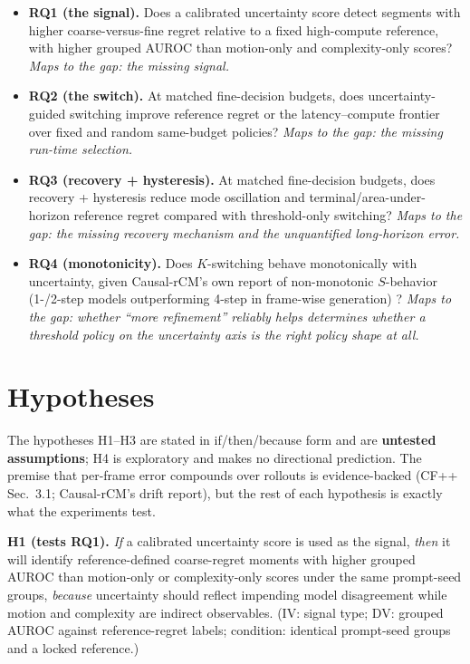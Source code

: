 \documentclass[11pt,a4paper]{article}
\begin{document}
\begin{itemize}[leftmargin=1.6em, itemsep=2pt]
\item \textbf{RQ1 (the signal).} Does a calibrated uncertainty score detect segments with higher coarse-versus-fine regret relative to a fixed high-compute reference, with higher grouped AUROC than motion-only and complexity-only scores? \emph{Maps to the gap: the missing signal.}
\item \textbf{RQ2 (the switch).} At matched fine-decision budgets, does uncertainty-guided switching improve reference regret or the latency--compute frontier over fixed and random same-budget policies? \emph{Maps to the gap: the missing run-time selection.}
\item \textbf{RQ3 (recovery + hysteresis).} At matched fine-decision budgets, does recovery + hysteresis reduce mode oscillation and terminal/area-under-horizon reference regret compared with threshold-only switching? \emph{Maps to the gap: the missing recovery mechanism and the unquantified long-horizon error.}
\item \textbf{RQ4 (monotonicity).} Does $K$-switching behave monotonically with uncertainty, given Causal-rCM's own report of non-monotonic $S$-behavior (1-/2-step models outperforming 4-step in frame-wise generation) \parencite{zhengCausalrCMUnifiedTeacherForcing2026}? \emph{Maps to the gap: whether ``more refinement'' reliably helps determines whether a threshold policy on the uncertainty axis is the right policy shape at all.}
\end{itemize}

\section{Hypotheses}\label{sec:hyp}

The hypotheses H1--H3 are stated in if/then/because form and are \textbf{untested assumptions}; H4 is exploratory and makes no directional prediction. The premise that per-frame error compounds over rollouts is evidence-backed (CF++ Sec.~3.1; Causal-rCM's drift report), but the rest of each hypothesis is exactly what the experiments test.

\textbf{H1 (tests RQ1).} \emph{If} a calibrated uncertainty score is used as the signal, \emph{then} it will identify reference-defined coarse-regret moments with higher grouped AUROC than motion-only or complexity-only scores under the same prompt-seed groups, \emph{because} uncertainty should reflect impending model disagreement while motion and complexity are indirect observables. (IV: signal type; DV: grouped AUROC against reference-regret labels; condition: identical prompt-seed groups and a locked reference.)
\end{document}
